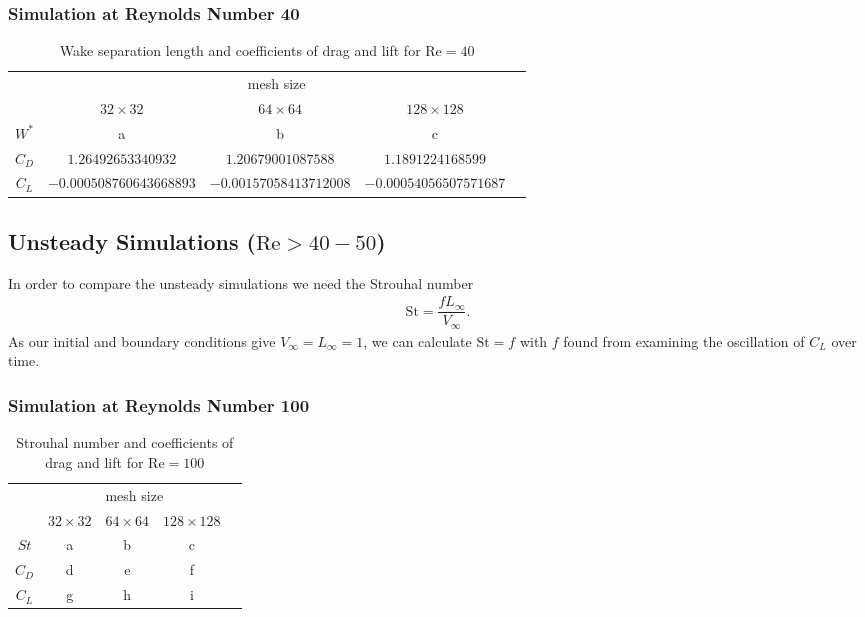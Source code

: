 	\subsubsection{Simulation at Reynolds Number 40}
		\begin{table}[htp]
			\centering
			\begin{tabular}{|c||c|c|c|c}
				\cline{1-4}
				\rule{0pt}{2,3ex}\multirow{2}{*}{}   & \multicolumn{3}{c|}{mesh size} &  \\ \cline{2-4}
				\rule{0pt}{2,3ex}& $32 \times 32$       & $64 \times 64$       & $128 \times 128$      &  \\ \cline{1-4}
				\rule{0pt}{2,3ex}$W^*$ 				 & a        & b        & c        &  \\ \cline{1-4}
				\rule{0pt}{2,3ex}$C_D$                & $1.26492653340932$        & $1.20679001087588$        & $1.1891224168599$       &  \\ \cline{1-4}
				\rule{0pt}{2,3ex}$C_L$                & $-0.000508760643668893$        & $-0.00157058413712008$        & $-0.00054056507571687$        &  \\ \cline{1-4}
			\end{tabular}
			\caption{Wake separation length and coefficients of drag and lift for $\text{Re}=40$}
			\label{tab:re40}
		\end{table}
	\subsection{Unsteady Simulations ($\text{Re}> 40-50$)}
	In order to compare the unsteady simulations we need the Strouhal number
	\begin{align}
		\text{St} = \dfrac{f  L_\infty}{V_\infty}.
	\end{align}
	As our initial and boundary conditions give $V_\infty = L_\infty = 1$, we can calculate $\text{St} = f$ with $f$ found from examining the oscillation of $C_L$ over time. 
	\subsubsection{Simulation at Reynolds Number 100}
			\begin{table}[htp]
				\centering
				\begin{tabular}{|c||c|c|c|c}
					\cline{1-4}
					\rule{0pt}{2,3ex}\multirow{2}{*}{}   & \multicolumn{3}{c|}{mesh size} &  \\ \cline{2-4}
					\rule{0pt}{2,3ex}& $32 \times 32$       & $64 \times 64$       & $128 \times 128$      &  \\ \cline{1-4}
					\rule{0pt}{2,3ex}$St$ 				 & a        & b        & c        &  \\ \cline{1-4}
					\rule{0pt}{2,3ex}$C_D$                & d        & e        & f        &  \\ \cline{1-4}
					\rule{0pt}{2,3ex}$C_L$                & g        & h        & i        &  \\ \cline{1-4}
				\end{tabular}
				\caption{Strouhal number and coefficients of drag and lift for $\text{Re}=100$}
				\label{tab:re100}
			\end{table}
			
